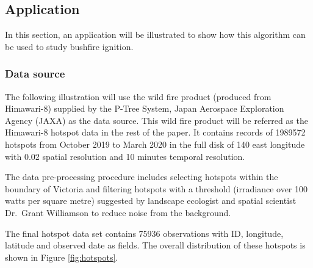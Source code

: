 \hypertarget{application}{%
\subsection{Application}\label{application}}

In this section, an application will be illustrated to show how this
algorithm can be used to study bushfire ignition.

\hypertarget{data-source}{%
\subsubsection{Data source}\label{data-source}}

The following illustration will use the wild fire product (produced from
Himawari-8) supplied by the P-Tree System, Japan Aerospace Exploration
Agency (JAXA) \citeyearpar{jaxa} as the data source. This wild fire
product will be referred as the Himawari-8 hotspot data in the rest of
the paper. It contains records of 1989572 hotspots from October 2019 to
March 2020 in the full disk of 140 \textdegree east longitude with 0.02
\textdegree spatial resolution and 10 minutes temporal resolution.

The data pre-processing procedure includes selecting hotspots within the
boundary of Victoria and filtering hotspots with a threshold (irradiance
over 100 watts per square metre) suggested by landscape ecologist and
spatial scientist Dr.~Grant Williamson \citeyearpar{hotspots} to reduce
noise from the background.

The final hotspot data set contains 75936 observations with ID,
longitude, latitude and observed date as fields. The overall
distribution of these hotspots is shown in Figure \ref{fig:hotspots}.

